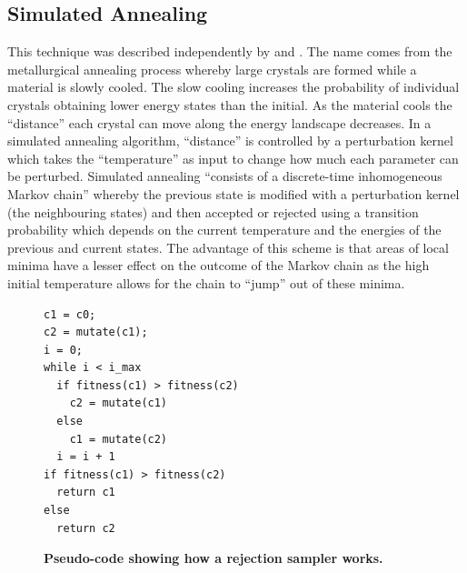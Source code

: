 \subsection{Simulated Annealing}
This technique was described independently by \citet{Kirkpatrick1983} and \citet{Cerny1985}. The name comes from the metallurgical annealing process whereby large crystals are formed while a material is slowly cooled. The slow cooling increases the probability of individual crystals obtaining lower energy states than the initial. As the material cools the ``distance'' each crystal can move along the energy landscape decreases. In a simulated annealing algorithm, ``distance'' is controlled by a perturbation kernel which takes the ``temperature'' as input to change how much each parameter can be perturbed.
Simulated annealing ``consists of a discrete-time inhomogeneous Markov chain''\cite{Bertsimas1993} whereby the previous state is modified with a perturbation kernel (the neighbouring states) and then accepted or rejected using a transition probability which depends on the current temperature and the energies of the previous and current states. The advantage of this scheme is that areas of local minima have a lesser effect on the outcome of the Markov chain as the high initial temperature allows for the chain to ``jump'' out of these minima.
\begin{figure}[tbp]
\small
\begin{verbatim}
c1 = c0;
c2 = mutate(c1);
i = 0;
while i < i_max
  if fitness(c1) > fitness(c2)
    c2 = mutate(c1)
  else
    c1 = mutate(c2)
  i = i + 1
if fitness(c1) > fitness(c2)
  return c1
else
  return c2
\end{verbatim}
\caption[Pseudo-code showing how a rejection sampler works.]{{\bf Pseudo-code showing how a rejection sampler works.}
\label{fig:sa_code}}
\end{figure}

